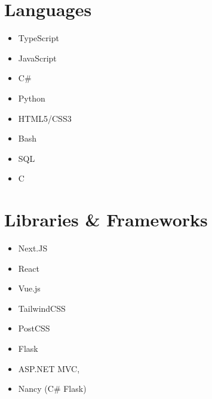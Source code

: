 \documentclass[11pt]{amsart}
\begin{document}
\hypertarget{x-languages}{\section*{Languages}}
\begin{itemize}

\item TypeScript

\item JavaScript

\item C#

\item Python

\item HTML5/CSS3

\item Bash

\item SQL

\item C

\end{itemize}


\hypertarget{x-libraries-&-frameworks}{\section*{Libraries & Frameworks}}
\begin{itemize}

\item Next.JS

\item React

\item Vue.js

\item TailwindCSS

\item PostCSS

\item Flask

\item ASP.NET MVC,

\item Nancy (C# Flask)

\end{itemize}
\end{document}
